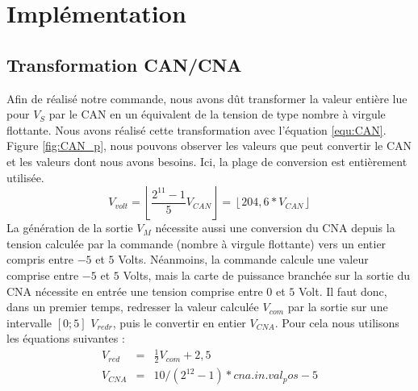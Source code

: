 \chapter{Implémentation}
\section{Transformation CAN/CNA}
Afin de réalisé notre commande, nous avons dût transformer la valeur entière lue pour $V_S$ par le CAN en un équivalent de la tension de type nombre à virgule flottante. Nous avons réalisé cette transformation avec l'équation \ref{equ:CAN}. Figure \ref{fig:CAN_p}, nous pouvons observer les valeurs que peut convertir le CAN et les valeurs dont nous avons besoins. Ici, la plage de conversion est entièrement utilisée.
\begin{equation}
\label{equ:CAN}
V_{volt} = 
\left\lfloor 
\frac{2^{11}-1}{5}V_{CAN}
\right\rfloor
= 
\left\lfloor 
204,6*V_{CAN}
\right\rfloor
\end{equation}
La génération de la sortie $V_M$ nécessite aussi une conversion du CNA depuis la tension calculée par la commande (nombre à virgule flottante) vers un entier compris entre $-5$ et $5$ Volts. Néanmoins, la commande calcule une valeur comprise entre $-5$ et $5$ Volts, mais la carte de puissance branchée sur la sortie du CNA nécessite en entrée une tension comprise entre $0$ et $5$ Volt. Il faut donc, dans un premier temps, redresser la valeur calculée $V_{com}$ par la sortie sur une intervalle $\left[0;5\right]$ $V_{redr}$, puis le convertir en entier $V_{CNA}$. Pour cela nous utilisons les équations suivantes :
\begin{equation}
\begin{array}{lcl}
V_{red}	&=&	\frac{1}{2}V_{com}+2,5\\
V_{CNA} &=& 10/(2^{12}-1)*cna.in.val_pos-5
\end{array}
\end{equation}
